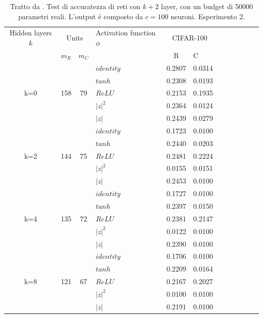 \documentclass[a4paper,12pt]{report}
\begin{document}
 \newpage
 
 \begin{table}[h]
  \centering
  \begin{tabular}{cp{} cp{} cp{}   cp{} cp{} cp{}}
   \cline{1-6}
   Hidden layers $k$ & \multicolumn{2}{c}{Units} $p_R$ & Activation function $\phi$ & \multicolumn{2}{c}{CIFAR-100}\\
   \cline{2-3} \cline{5-6}
   & $m_R$ & $m_C$ & & R & C \\
   \cline{1-6}
   & & & $identity$ & 0.2807 & 0.0314 \\
   \cline{4-6}
   & & & $tanh$ & 0.2308 & 0.0193 \\
   \cline{4-6}
   k=0 & 158 & 79 & $ReLU$ & 0.2153 & 0.1935 \\
   \cline{4-6}
   & & & $|z|^2$ & 0.2364 & 0.0124 \\
   \cline{4-6}
   & & & $|z|$ & 0.2439 & 0.0279 \\
   \cline{1-6}
   
   \cline{1-6}
   & & & $identity$ & 0.1723 & 0.0100 \\
   \cline{4-6}
   & & & $tanh$ & 0.2440 & 0.0203 \\
   \cline{4-6}
   k=2 & 144 & 75 & $ReLU$ & 0.2481 & 0.2224 \\
   \cline{4-6}
   & & & $|z|^2$ & 0.0155 & 0.0151 \\
   \cline{4-6}
   & & & $|z|$ & 0.2453 & 0.0100 \\
   \cline{1-6}
   
   \cline{1-6}
   & & & $identity$ & 0.1727 & 0.0100 \\
   \cline{4-6}
   & & & $tanh$ & 0.2397 & 0.0150 \\
   \cline{4-6}
   k=4 & 135 & 72 & $ReLU$ & 0.2381 & 0.2147 \\
   \cline{4-6}
   & & & $|z|^2$ & 0.0122 & 0.0100 \\
   \cline{4-6}
   & & & $|z|$ & 0.2390 & 0.0100 \\
   \cline{1-6}
   
   \cline{1-6}
   & & & $identity$ & 0.1706 & 0.0100 \\
   \cline{4-6}
   & & & $tanh$ & 0.2209 & 0.0164 \\
   \cline{4-6}
   k=8 & 121 & 67 & $ReLU$ & 0.2167 & 0.2027 \\
   \cline{4-6}
   & & & $|z|^2$ & 0.0100 & 0.0100 \\
   \cline{4-6}
   & & & $|z|$ & 0.2191 & 0.0100 \\
   \cline{1-6}
      
  \end{tabular}
  \caption{Tratto da \cite{monning2018evaluation}. Test di accuratezza di reti con $k+2$ layer, con un budget di 50000 parametri reali. L'output \'e composto da $c=100$ neuroni. Esperimento 2.}
  \label{CIFAR-1002Tab}
 \end{table}
  
\end{document}
